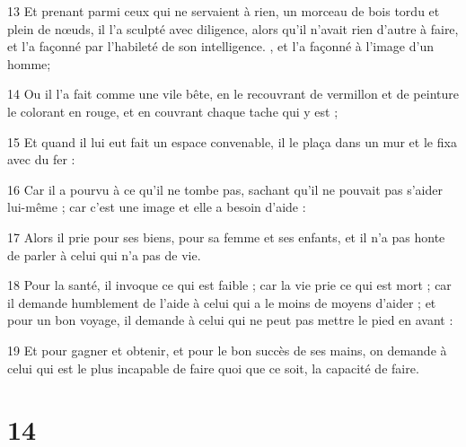 \par 13 Et prenant parmi ceux qui ne servaient à rien, un morceau de bois tordu et plein de nœuds, il l'a sculpté avec diligence, alors qu'il n'avait rien d'autre à faire, et l'a façonné par l'habileté de son intelligence. , et l'a façonné à l'image d'un homme;
\par 14 Ou il l'a fait comme une vile bête, en le recouvrant de vermillon et de peinture le colorant en rouge, et en couvrant chaque tache qui y est ;
\par 15 Et quand il lui eut fait un espace convenable, il le plaça dans un mur et le fixa avec du fer :
\par 16 Car il a pourvu à ce qu'il ne tombe pas, sachant qu'il ne pouvait pas s'aider lui-même ; car c'est une image et elle a besoin d'aide :
\par 17 Alors il prie pour ses biens, pour sa femme et ses enfants, et il n'a pas honte de parler à celui qui n'a pas de vie.
\par 18 Pour la santé, il invoque ce qui est faible ; car la vie prie ce qui est mort ; car il demande humblement de l'aide à celui qui a le moins de moyens d'aider ; et pour un bon voyage, il demande à celui qui ne peut pas mettre le pied en avant :
\par 19 Et pour gagner et obtenir, et pour le bon succès de ses mains, on demande à celui qui est le plus incapable de faire quoi que ce soit, la capacité de faire.

\chapter{14}

